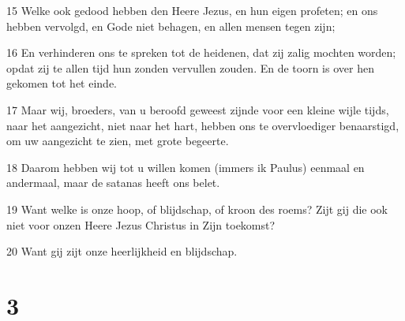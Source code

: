 \par 15 Welke ook gedood hebben den Heere Jezus, en hun eigen profeten; en ons hebben vervolgd, en Gode niet behagen, en allen mensen tegen zijn;
\par 16 En verhinderen ons te spreken tot de heidenen, dat zij zalig mochten worden; opdat zij te allen tijd hun zonden vervullen zouden. En de toorn is over hen gekomen tot het einde.
\par 17 Maar wij, broeders, van u beroofd geweest zijnde voor een kleine wijle tijds, naar het aangezicht, niet naar het hart, hebben ons te overvloediger benaarstigd, om uw aangezicht te zien, met grote begeerte.
\par 18 Daarom hebben wij tot u willen komen (immers ik Paulus) eenmaal en andermaal, maar de satanas heeft ons belet.
\par 19 Want welke is onze hoop, of blijdschap, of kroon des roems? Zijt gij die ook niet voor onzen Heere Jezus Christus in Zijn toekomst?
\par 20 Want gij zijt onze heerlijkheid en blijdschap.

\chapter{3}

